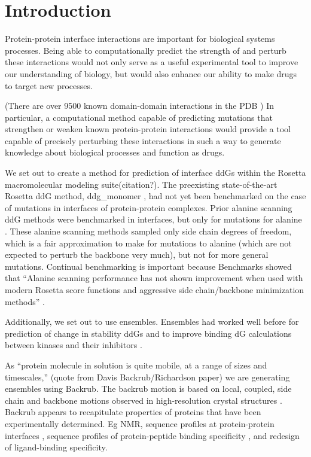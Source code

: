 \section{Introduction}

Protein-protein interface interactions are important for biological systems processes.
Being able to computationally predict the strength of and perturb these interactions would not only serve as a useful experimental tool to improve our understanding of biology, but would also enhance our ability to make drugs to target new processes.

(There are over 9500 known domain-domain interactions in the PDB \cite{finn_ipfam:_2014}) In particular, a computational method capable of predicting mutations that strengthen or weaken known protein-protein interactions would provide a tool capable of precisely perturbing these interactions in such a way to generate knowledge about biological processes and function as drugs.

We set out to create a method for prediction of interface ddGs within the Rosetta macromolecular modeling suite(citation?). The preexisting state-of-the-art Rosetta ddG method,  ddg\_monomer \cite{kellogg_role_2011}, had not yet been benchmarked on the case of mutations in interfaces of protein-protein complexes. Prior alanine scanning ddG methods were benchmarked in interfaces, but only for mutations for alanine \cite{kortemme_simple_2002,conchuir_web_2015}. These alanine scanning methods sampled only side chain degrees of freedom, which is a fair approximation to make for mutations to alanine (which are not expected to perturb the backbone very much), but not for more general mutations. Continual benchmarking is important because Benchmarks showed that ``Alanine scanning performance has not shown improvement when used with modern Rosetta score functions and aggressive side chain/backbone minimization methods'' \cite{conchuir_web_2015}.

Additionally, we set out to use ensembles. Ensembles had worked well before for prediction of change in stability ddGs \cite{benedix_predicting_2009} and to improve binding dG calculations between kinases and their inhibitors \cite{araki_effect_2016}.

As ``protein molecule in solution is quite mobile, at a range of sizes and timescales,'' (quote from Davis Backrub/Richardson paper) we are generating ensembles using Backrub. The backrub motion is based on local, coupled, side chain and backbone motions observed in high-resolution crystal structures \cite{davis_backrub_2006}. Backrub appears to recapitulate properties of proteins that have been experimentally determined. Eg NMR\cite{friedland_correspondence_2009}, sequence profiles at protein-protein interfaces \cite{humphris_prediction_2008}, sequence profiles of protein-peptide binding specificity \cite{smith_structure-based_2010,smith_predicting_2011}, and redesign of ligand-binding specificity\cite{ollikainen_coupling_2015}.

